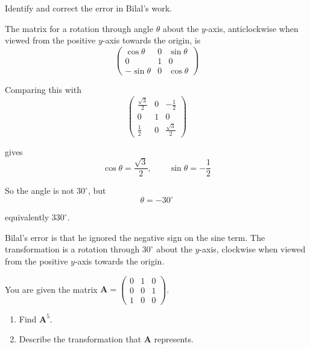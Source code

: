 \documentclass[leqno]{article}
\begin{document}
\begin{enumerate}[
  label=\textbf{\arabic*.},
  leftmargin=*,
  topsep=0pt,
  partopsep=0pt,
  parsep=0pt
]
Identify and correct the error in Bilal's work. 

\vspace*{10pt}

\begin{djsSolution}
The matrix for a rotation through angle $\theta$ about the $y$-axis, anticlockwise when viewed from the positive $y$-axis towards the origin, is
\[
\begin{pmatrix}
\cos\theta & 0 & \sin\theta\\
0 & 1 & 0\\
-\sin\theta & 0 & \cos\theta
\end{pmatrix}
\]

Comparing this with
\[
\begin{pmatrix}
\frac{\sqrt3}{2} & 0 & -\frac12\\
0 & 1 & 0\\
\frac12 & 0 & \frac{\sqrt3}{2}
\end{pmatrix}
\]

gives
\[
\cos\theta=\frac{\sqrt3}{2},\qquad \sin\theta=-\frac12
\]

So the angle is not $30^\circ$, but
\[
\theta=-30^\circ
\]

equivalently $330^\circ$.

Bilal's error is that he ignored the negative sign on the sine term. The transformation is a rotation through $30^\circ$ about the $y$-axis, clockwise when viewed from the positive $y$-axis towards the origin.
\end{djsSolution}


\newpage

\questionitem

You are given the matrix $\mathbf{A} = \begin{pmatrix}0 & 1 & 0\\0 & 0 & 1\\1 & 0 & 0\end{pmatrix}$. \\

\begin{enumerate}[label=\textbf{(\alph*)}]
  \item Find $\mathbf{A}^5$.  \\
  \item Describe the transformation that $\mathbf{A}$ represents.  \\
\end{enumerate}


\end{enumerate}
\end{document}

